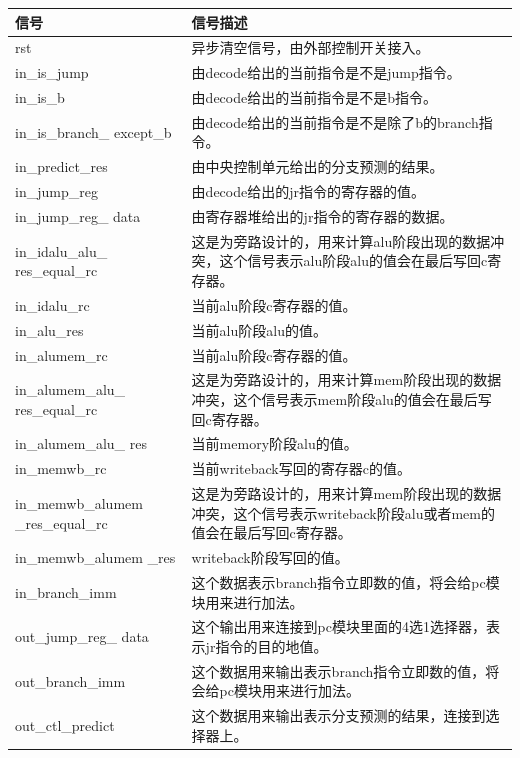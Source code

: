 \begin{center}
    \label{table:predict}
    \begin{longtable}{p{}p{}}
        \toprule
        信号 & 信号描述 \\
        \midrule
            rst & 异步清空信号，由外部控制开关接入。\\
            in\_is\_jump & 由decode给出的当前指令是不是jump指令。\\
            in\_is\_b & 由decode给出的当前指令是不是b指令。\\
            in\_is\_branch\_  except\_b & 由decode给出的当前指令是不是除了b的branch指令。 \\
            in\_predict\_res & 由中央控制单元给出的分支预测的结果。\\
            in\_jump\_reg & 由decode给出的jr指令的寄存器的值。\\
            in\_jump\_reg\_  data & 由寄存器堆给出的jr指令的寄存器的数据。\\
            in\_idalu\_alu\_  res\_equal\_rc & 这是为旁路设计的，用来计算alu阶段出现的数据冲突，这个信号表示alu阶段alu的值会在最后写回c寄存器。\\
            in\_idalu\_rc & 当前alu阶段c寄存器的值。\\
            in\_alu\_res & 当前alu阶段alu的值。\\
            in\_alumem\_rc & 当前alu阶段c寄存器的值。\\
            in\_alumem\_alu\_  res\_equal\_rc & 这是为旁路设计的，用来计算mem阶段出现的数据冲突，这个信号表示mem阶段alu的值会在最后写回c寄存器。\\
            in\_alumem\_alu\_  res & 当前memory阶段alu的值。\\
            in\_memwb\_rc & 当前writeback写回的寄存器c的值。\\
            in\_memwb\_alumem  \_res\_equal\_rc & 这是为旁路设计的，用来计算mem阶段出现的数据冲突，这个信号表示writeback阶段alu或者mem的值会在最后写回c寄存器。\\
            in\_memwb\_alumem  \_res & writeback阶段写回的值。\\
            in\_branch\_imm & 这个数据表示branch指令立即数的值，将会给pc模块用来进行加法。\\
            out\_jump\_reg\_  data & 这个输出用来连接到pc模块里面的4选1选择器，表示jr指令的目的地值。\\
            out\_branch\_imm & 这个数据用来输出表示branch指令立即数的值，将会给pc模块用来进行加法。\\
            out\_ctl\_predict & 这个数据用来输出表示分支预测的结果，连接到选择器上。\\
        \bottomrule
    \end{longtable}
\end{center}
    

